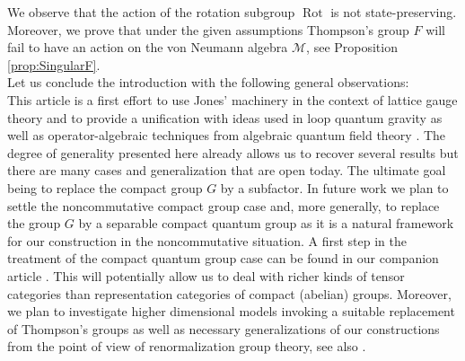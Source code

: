 \documentclass[a4paper,12pt]{amsart}
\numberwithin{equation}{section}
\theoremstyle{definition}
\newcommand{\scrM}{\mathscr M}
\DeclareMathOperator{\Rot}{Rot}
\begin{document}
We observe that the action of the rotation subgroup $\Rot$ is not state-preserving. Moreover, we prove that under the given assumptions Thompson's group $F$ will fail to have an action on the von Neumann algebra $\scrM$, see Proposition \ref{prop:SingularF}.\\[0.25cm]
Let us conclude the introduction with the following general observations:\\[0.1cm]
This article is a first effort to use Jones' machinery in the context of lattice gauge theory and to provide a unification with ideas used in loop quantum gravity as well as operator-algebraic techniques from algebraic quantum field theory \cite{Haag-96-Local-Quantum-Physics}.
The degree of generality presented here already allows us to recover several results but there are many cases and generalization that are open today.
The ultimate goal being to replace the compact  group $G$ by a subfactor.
In future work we plan to settle the noncommutative compact group case and, more generally, to replace the group $G$ by a separable compact quantum group as it is a natural framework for our construction in the noncommutative situation. A first step in the treatment of the compact quantum group case can be found in our companion article {\cite[Remark 4.3]{Brot-Stottmeister-Phys}}.
This will potentially allow us to deal with richer kinds of tensor categories than representation categories of compact (abelian) groups.
Moreover, we plan to investigate higher dimensional models invoking a suitable replacement of Thompson's groups as well as necessary generalizations of our constructions from the point of view of renormalization group theory, see also {\cite[Section 5]{Brot-Stottmeister-Phys}}.\\[0.1cm]
\end{document}
